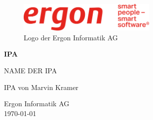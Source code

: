\begin{titlepage}

    \begin{figure}
        \begin{center}
            \includegraphics[width=0.6\textwidth]{ressourcen/ergon_logo_gross}
            \captionsetup{textformat=empty, labelformat=empty}
            \caption[Logo der Ergon Informatik AG~\parencite{ergonlogo}]{Logo der Ergon Informatik AG}\label{fig:ergon-logo-gross}
        \end{center}
    \end{figure}
    \begin{center}
        \vspace*{2cm}
        \Huge
        \textbf{IPA}

        \vspace{0.5cm}
        \Large
        NAME DER IPA

        \vfill

        \Large
        IPA von Marvin Kramer

        \vspace*{3cm}

        \large
        Ergon Informatik AG\\
        \today\\

    \end{center}
\end{titlepage}
